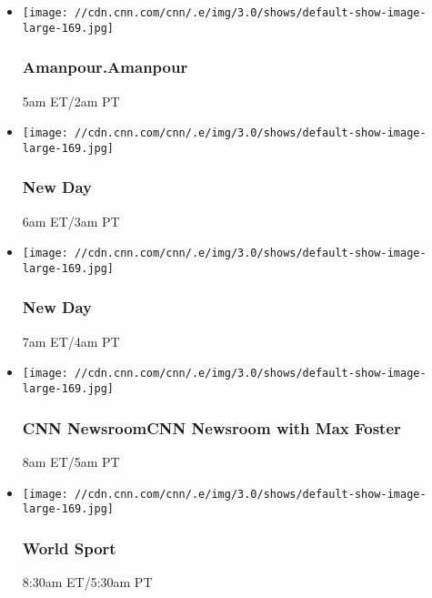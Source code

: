 \begin{itemize}
\item
  \texttt{[image: //cdn.cnn.com/cnn/.e/img/3.0/shows/default-show-image-large-169.jpg]}

  \hypertarget{amanpouramanpour--11}{%
  \subsubsection{Amanpour.Amanpour }\label{amanpouramanpour--11}}

  5am ET/2am PT
\end{itemize}

\begin{itemize}
\item
  \texttt{[image: //cdn.cnn.com/cnn/.e/img/3.0/shows/default-show-image-large-169.jpg]}

  \hypertarget{new-day-8}{%
  \subsubsection{New Day}\label{new-day-8}}

  6am ET/3am PT
\end{itemize}

\begin{itemize}
\item
  \texttt{[image: //cdn.cnn.com/cnn/.e/img/3.0/shows/default-show-image-large-169.jpg]}

  \hypertarget{new-day-9}{%
  \subsubsection{New Day}\label{new-day-9}}

  7am ET/4am PT
\end{itemize}

\begin{itemize}
\item
  \texttt{[image: //cdn.cnn.com/cnn/.e/img/3.0/shows/default-show-image-large-169.jpg]}

  \hypertarget{cnn-newsroomcnn-newsroom-with-max-foster--4}{%
  \subsubsection{CNN NewsroomCNN Newsroom with Max Foster
  }\label{cnn-newsroomcnn-newsroom-with-max-foster--4}}

  8am ET/5am PT
\end{itemize}

\begin{itemize}
\item
  \texttt{[image: //cdn.cnn.com/cnn/.e/img/3.0/shows/default-show-image-large-169.jpg]}

  \hypertarget{world-sport-17}{%
  \subsubsection{World Sport}\label{world-sport-17}}

  8:30am ET/5:30am PT
\end{itemize}

